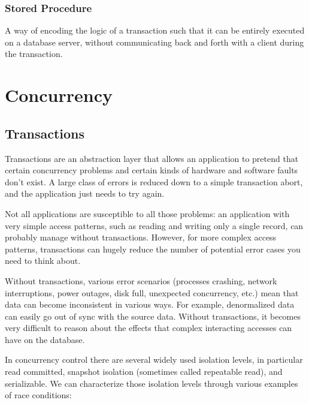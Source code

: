 \documentclass{article}
\begin{document}
    \subsubsection{Stored Procedure}
    A way of encoding the logic of a transaction such that it can be entirely executed  on a database server, without communicating back and forth with a client during the transaction.

\newpage
\section{Concurrency}
    \subsection{Transactions}
    Transactions are an abstraction layer that allows an application to pretend that certain concurrency problems and certain kinds of hardware and software faults don’t exist. A large class of errors is reduced down to a simple transaction abort, and the application just needs to try again.
    
    Not all applications are susceptible to all those problems: an application with very simple access patterns, such as reading and writing only a single record, can probably manage without transactions. However, for more complex access patterns, transactions can hugely reduce the number of potential error cases you need to think about.
    
    Without transactions, various error scenarios (processes crashing, network interruptions, power outages, disk full, unexpected concurrency, etc.) mean that data can become inconsistent in various ways. For example, denormalized data can easily go out of sync with the source data. Without transactions, it becomes very difficult to reason about the effects that complex interacting accesses can have on the database.
    
    In concurrency control there are several widely used isolation levels, in particular read committed, snapshot isolation (sometimes called repeatable read), and serializable. We can characterize those isolation levels through various examples of race conditions:
    
\end{document}
